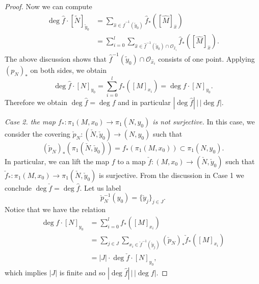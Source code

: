 \documentclass[10pt,a4paper]{amsart}
\begin{document}
\begin{proof}
Now we can compute
\[
\begin{split}
\deg \hat f\cdot [\tilde N]_{\tilde y_0}&=\sum_{\hat x\in \hat f^{-1}(\tilde y_0)}\hat f_*([\widehat M]_{\hat x})\\
&=\sum_{i=0}^l\sum_{\hat x\in \hat f^{-1}(\tilde y_0)\cap \mathcal O_{\hat x_i}}\hat f_*([\widehat M]_{\hat x}).
\end{split}
\]
The above discussion shows that $\hat{f}^{-1}(\tilde{y}_{0})\cap\mathcal{O}_{\hat{x}_{i}}$ consists of one point. Applying $(p_{N})_{*}$ on both sides, we obtain
$$
\deg \hat f\cdot [N]_{y_0}=\sum_{i=0}^l f_*([M]_{x_i})=\deg f\cdot [N]_{y_0}.
$$
Therefore we obtain $\deg \hat f=\deg f$ and in particular $|\deg\hat f|\,\big |\,|\deg f|$.

\medskip
{\it Case 2. the map $f_*:\pi_1(M,x_0)\to \pi_1(N,y_0)$ is not surjective.} In this case, we consider the covering $\check p_N:(\check N, \check y_0) \to (N,y_0)$ such that
$$
(\check p_N)_*(\pi_1(\check N,\check y_0))=f_*(\pi_1(M,x_0))\subset \pi_1(N,y_0).
$$
In particular, we can lift the map $f$ to a map $\check f:(M,x_0)\to (\check N,\check y_0)$ such that $\check{f}_{*}:\pi_{1}(M,x_{0})\to\pi_{1}(\check{N},\check{y}_{0})$ is surjective. From the discussion in Case 1 we conclude $\deg \check f=\deg \hat f$. Let us label
$$
\check p_N^{-1}(y_0)=\{\check y_j\}_{j\in J}.
$$
Notice that we have the relation
\[
\begin{split}
\deg f\cdot [N]_{y_0}&=\sum_{i=0}^l f_*([M]_{x_i})\\
&=\sum_{j\in J}\sum_{x_i\in \check f^{-1}(\check y_j)}{(\check{p}_N)_*}\check f_*([M]_{x_i})\\
&=|J|\cdot \deg \check f\cdot [N]_{y_0},
\end{split}
\]
which implies $|J|$ is finite and so $|\deg\hat f|\,\big |\,|\deg f|$.
\end{proof}
\end{document}
